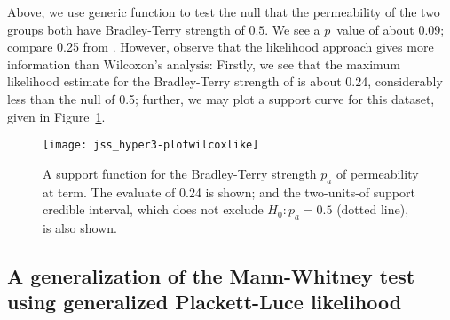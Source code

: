 \documentclass[article]{jss}
\begin{document}
%
Above, we use generic function  to test the null
that the permeability of the two groups both have Bradley-Terry
strength of $0.5$.  We see a $p$~value of about 0.09; compare 0.25 from
.  However, observe that the 
likelihood approach gives more information than Wilcoxon's analysis:
Firstly, we see that the maximum likelihood estimate for the
Bradley-Terry strength of  is about 0.24, considerably less
than the null of 0.5; further, we may plot a support curve for this
dataset, given in Figure~\ref{wilcox_likelihood}.

\begin{figure}[t!]
\centering
\texttt{[image: jss\_hyper3-plotwilcoxlike]}
\caption{A\label{wilcox_likelihood} support function for the Bradley-Terry
strength $p_a$ of permeability at term.  The evaluate of 0.24 is
shown; and the two-units-of support credible interval, which does not
exclude $H_0\colon p_a=0.5$ (dotted line), is also shown.}
\end{figure}

\subsection{A generalization of the Mann-Whitney test using
generalized Plackett-Luce likelihood}
\end{document}
